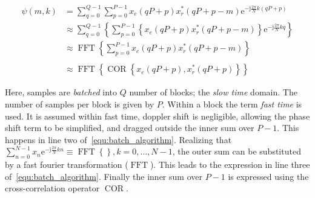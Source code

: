 \begin{equation}\label{equ:batch_algorithm}
    \begin{split}
        \psi(m,k) & = \sum_{q = 0}^{Q - 1}{\sum_{p = 0}^{P - 1}{x_{e}(q P + p) x_{r}^{*}(q P + p - m) \mathrm{e}^{-\mathrm{j} \frac{2 \pi}{N} k (q P + p)}}} \\
        & \approx \sum_{q = 0}^{Q - 1}{ \left\{ \sum_{p = 0}^{P - 1}{ \left\{ x_{e}(q P + p) x_{r}^{*}(q P + p - m) \right\} } \mathrm{e}^{-\mathrm{j} \frac{2 \pi}{N} k q} \right\} } \\
        & \approx \operatorname{FFT} \left\{ \sum_{p = 0}^{P - 1}{ x_{e}(q P + p) x_{r}^{*}(q P + p - m) } \right\} \\
        \\
        & \approx \operatorname{FFT} { \left\{ \operatorname{COR} { \left\{ x_{e}(q P + p), x_{r}^{*}(q P + p) \right\} } \right\} }
    \end{split}
\end{equation}

Here, samples are \emph{batched} into \(Q\) number of blocks; the \emph{slow time} domain. The number of samples per block is given by \(P\). Within a block the term \emph{fast time} is used. It is assumed within fast time, doppler shift is negligible, allowing the phase shift term to be simplified, and dragged outside the inner sum over \(P - 1\). This happens in line two of~\ref{equ:batch_algorithm}. Realizing that \(\sum_{n = 0}^{N - 1}{ x_{n} \mathrm{e}^{-\mathrm{j} \frac{2 \pi}{N} k n} } \equiv \operatorname{FFT}{ \left\{ \right\} }, k = 0, \dots, N - 1 \), the outer sum can be substituted by a fast fourier transformation (\(\operatorname{FFT}\)). This leads to the expression in line three of~\ref{equ:batch_algorithm}. Finally the inner sum over \(P - 1\) is expressed using the cross-correlation operator \(\operatorname{COR}\).
